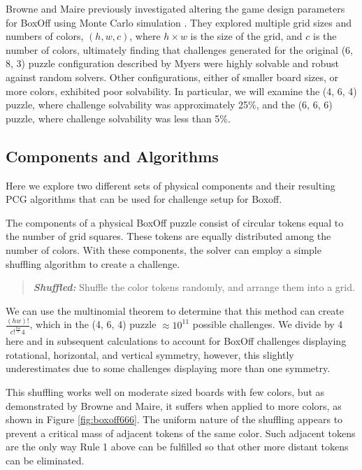 \documentclass[journal]{IEEEtran}
\begin{document}
Browne and Maire previously investigated altering the game design parameters for BoxOff using Monte Carlo simulation \cite{MCPUZZLE}. They explored multiple grid sizes and numbers of colors, $(h, w, c)$, where $h \times w$ is the size of the grid, and $c$ is the number of colors, ultimately finding that challenges generated for the original (6, 8, 3) puzzle configuration described by Myers were highly solvable and robust against random solvers. Other configurations, either of smaller board sizes, or more colors, exhibited poor solvability. In particular, we will examine the (4, 6, 4) puzzle, where challenge solvability was approximately 25\%, and the (6, 6, 6) puzzle, where challenge solvability was less than 5\%.


\subsection{Components and Algorithms}
\noindent
Here we explore two different sets of physical components and their resulting PCG algorithms that can be used for challenge setup for Boxoff. 

The components of a physical BoxOff puzzle consist of circular tokens equal to the number of grid squares. These tokens are equally distributed among the number of colors. 
With these components, the solver can employ a simple shuffling algorithm to create a challenge.
\begin{quote}
    {\it \bf Shuffled:} Shuffle the color tokens randomly, and arrange them into a grid.
\end{quote}

We can use the multinomial theorem to determine that this method can create
$\frac{(hw)!}{c!^{\frac{hw}{c}}4}$, which in the (4, 6, 4) puzzle $\approx 10^{11}$ possible challenges.  We divide by 4 here and in subsequent calculations to account for BoxOff challenges displaying rotational, horizontal, and vertical symmetry, however, this slightly underestimates due to some challenges displaying more than one symmetry.

This shuffling works well on moderate sized boards with few colors, but as demonstrated by Browne and Maire, it suffers when applied to more colors, as shown in Figure \ref{fig:boxoff666}. The uniform nature of the shuffling appears to prevent a critical mass of adjacent tokens of the same color. Such adjacent tokens are the only way Rule 1 above can be fulfilled so that other more distant tokens can be eliminated.
\end{document}
